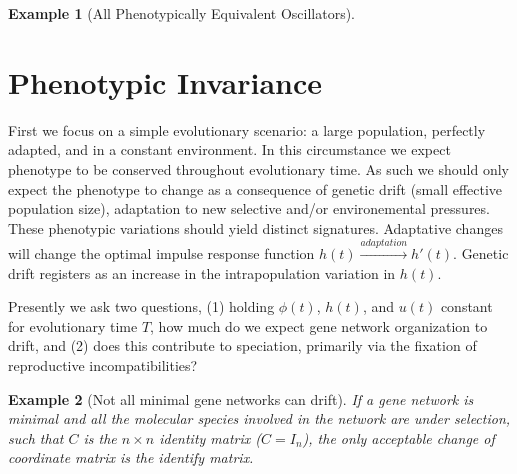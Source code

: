 \documentclass[9 pt]{article}
\newcommand{\1}{\mathbbm{1}}
\newtheorem{example}{Example}
\begin{document}
\begin{multicols}{2}
\begin{example}[All Phenotypically Equivalent Oscillators]
\begin{figure}[H]
    \end{figure}
  \end{example}
  \section*{Phenotypic Invariance}
    First we focus on a simple evolutionary scenario: a large population, perfectly adapted, and in a constant environment. In this circumstance we expect phenotype to be conserved throughout evolutionary time. As such we should only expect the phenotype to change as a consequence of genetic drift (small effective population size), adaptation to new selective and/or environemental pressures. These phenotypic variations should yield distinct signatures. Adaptative changes will change the optimal impulse response function $h(t) \xrightarrow{adaptation} h'(t)$. Genetic drift registers as an increase in the intrapopulation variation in $h(t)$. 
    
    Presently we ask two questions, (1) holding $\phi(t)$, $h(t)$, and $u(t)$ constant for evolutionary time $T$, how much do we expect gene network organization to drift, and (2) does this contribute to speciation, primarily via the fixation of reproductive incompatibilities?

    \begin{example}[Not all minimal gene networks can drift]
      If a gene network is minimal and all the molecular species involved in the network are under selection, such that $C$ is the $n \times n$ identity matrix  ($C = I_{n}$), the only acceptable  change of coordinate matrix is the identify matrix.
     

\end{example}
\end{multicols}
\end{document}
